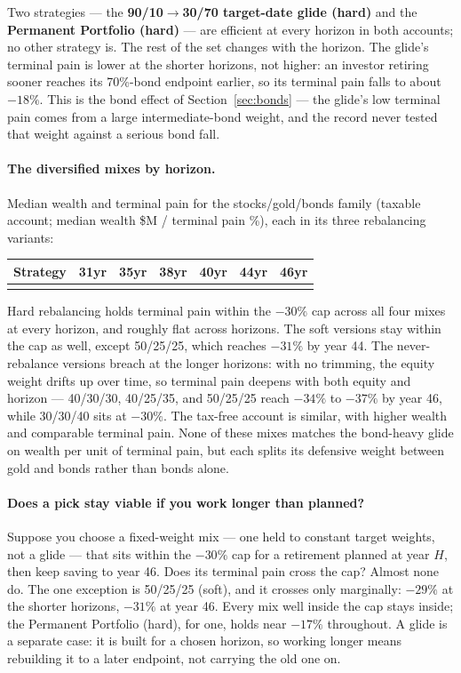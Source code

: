 \documentclass[11pt]{article}
\begin{document}
\noindent Two strategies --- the \textbf{90/10$\to$30/70 target-date glide (hard)} and the
\textbf{Permanent Portfolio (hard)} --- are efficient at every horizon in both accounts; no other
strategy is. The rest of the set changes with the horizon. The glide's terminal pain is lower at the
shorter horizons, not higher: an investor retiring sooner reaches its 70\%-bond endpoint earlier, so its
terminal pain falls to about $-18\%$. This is the bond effect of Section~\ref{sec:bonds} --- the glide's
low terminal pain comes from a large intermediate-bond weight, and the record never tested that weight
against a serious bond fall.

\paragraph{The diversified mixes by horizon.} Median wealth and terminal pain for the stocks/gold/bonds
family (taxable account; median wealth \$M / terminal pain \%), each in its three rebalancing variants:

{\small
\begin{center}
\begin{tabular}{@{}lcccccc@{}}
\toprule
Strategy & 31yr & 35yr & 38yr & 40yr & 44yr & 46yr \\
\midrule
\\
\bottomrule
\end{tabular}
\end{center}
}
\noindent Hard rebalancing holds terminal pain within the $-30\%$ cap across all four mixes at every
horizon, and roughly flat across horizons. The soft versions stay within the cap as well, except
50/25/25, which reaches $-31\%$ by year 44. The never-rebalance versions breach at the longer horizons:
with no trimming, the equity weight drifts up over time, so terminal pain deepens with both equity and
horizon --- 40/30/30, 40/25/35, and 50/25/25 reach $-34\%$ to $-37\%$ by year 46, while 30/30/40 sits at
$-30\%$. The tax-free account is similar, with higher wealth and comparable terminal pain. None of these
mixes matches the bond-heavy glide on wealth per unit of terminal pain, but each splits its defensive
weight between gold and bonds rather than bonds alone.

\paragraph{Does a pick stay viable if you work longer than planned?} Suppose you choose a fixed-weight
mix --- one held to constant target weights, not a glide --- that sits within the $-30\%$ cap for a
retirement planned at year $H$, then keep saving to year 46. Does its terminal pain cross the cap?
Almost none do. The one exception is 50/25/25 (soft), and it crosses only marginally: $-29\%$ at the
shorter horizons, $-31\%$ at year 46. Every mix well inside the cap stays inside; the Permanent Portfolio
(hard), for one, holds near $-17\%$ throughout. A glide is a separate case: it is built for a chosen
horizon, so working longer means rebuilding it to a later endpoint, not carrying the old one on.
\end{document}

